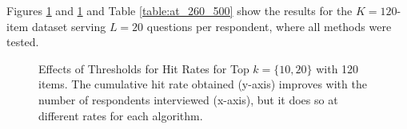 \documentclass[a4paper,12pt]{article}
\newcommand{\eric}[1]{\textcolor{red}{\textbf{(eric)} #1}}
\newcommand{\fixedexpress}{\textbf{express}}
\newcommand{\egreedy}{$\epsilon$-\textbf{greedy}}
\newcommand{\egreedythres}{$\epsilon$-\textbf{greedythres}}
\newcommand{\ts}{\textbf{TS} }
\newcommand{\edts}{$\epsilon$-$\delta$-\textbf{diffuse TS} }
\newcommand{\tsthres}{\textbf{TS-thres} }
\newcommand{\edtsthres}{$\epsilon$-$\delta$-\textbf{TS-thres} }
\newcommand{\numperset}{L}
\begin{document}
Figures \ref{fig:K120_L20_k3hit_k10hit} and \ref{fig:K120_L20_k3hit_k10hit} and Table \ref{table:at_260_500} show the results for the $K=120$-item dataset serving $\numperset=20$ questions per respondent, where all methods were tested.


\begin{figure}%
    \caption{Effects of Thresholds for Hit Rates for Top $k=\{10,20\}$ with 120 items. The cumulative hit rate obtained (y-axis) improves with the number of respondents interviewed (x-axis), but it does so at different rates for each algorithm.}%
    \label{fig:K120_L20_k3hit_k10hit}%
 	\begin{center}
    \qquad
	\end{center}
\end{figure}
\end{document}
